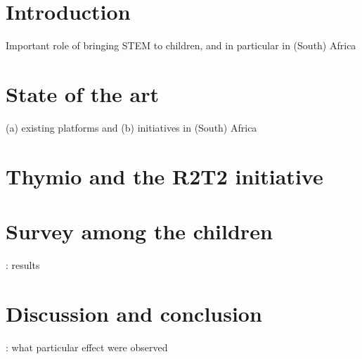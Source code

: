 \documentclass{intech-journal}
\begin{document}
\maketitle

\articleabstract{}
\keywords{}

\section{Introduction}
Important role of bringing STEM to children, and in particular in (South) Africa

\section{State of the art}
(a) existing platforms and (b) initiatives in (South) Africa

\section{Thymio and the R2T2 initiative}

\section{Survey among the children}: results

\section{Discussion and conclusion}: what particular effect were observed 


{}
\end{document}
